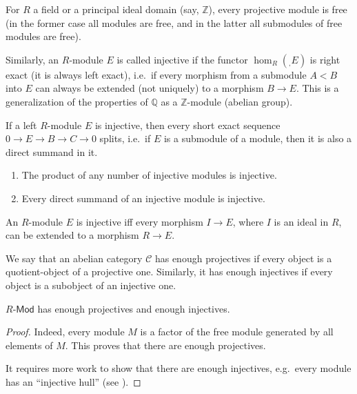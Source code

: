 \documentclass[english,letterpaper]{article}%
\numberwithin{equation}{section}
\numberwithin{figure}{section}
\numberwithin{table}{section}
\theoremstyle{definition}
\theoremstyle{definition}
\theoremstyle{definition}
\theoremstyle{plain}
\theoremstyle{plain}
\theoremstyle{plain}
\theoremstyle{plain}
\theoremstyle{remark}
\theoremstyle{remark}
\newcommand{\bbZ}{\mathbb{Z}}
\newcommand{\bbQ}{\mathbb{Q}}
\newcommand{\calC}{\mathcal{C}}
\begin{document}
For $R$ a field or a principal ideal domain (say, $\bbZ$), every projective module is free (in the former case all modules are free, and in the latter all submodules of free modules are free).


Similarly, an $R$-module $E$ is called injective if the functor $\hom_R(_,E)$ is right exact (it is always left exact), i.e.\ if every morphism from a submodule $A<B$ into $E$ can always be extended (not uniquely) to a morphism $B\to E$. This is a generalization of the properties of $\bbQ$ as a $\bbZ$-module (abelian group).

\begin{prop}
    If a left $R$-module $E$ is injective, then every short exact sequence $0\to E\to B\to C\to 0$ splits, i.e.\ if $E$ is a submodule of a module, then it is also a direct summand in it.
\end{prop}

\begin{prop}
    \begin{enumerate}
        \item The product of any number of injective modules is injective.
        \item Every direct summand of an injective module is injective.
    \end{enumerate}
\end{prop}

\begin{thm}
    An $R$-module $E$ is injective iff every morphism $I\to E$, where $I$ is an ideal in $R$, can be extended to a morphism $R\to E$.
\end{thm}


\begin{defn}
    We say that an abelian category $\calC$ has enough projectives if every object is a quotient-object of a projective one. Similarly, it has enough injectives if every object is a subobject of an injective one.
\end{defn}

\begin{prop}
    $R\text{-}\mathsf{Mod}$ has enough projectives and enough injectives. 
\end{prop}
\begin{proof}
     Indeed, every module $M$ is a factor of the free module generated by all elements of $M$. This proves that there are enough projectives. 
     
     It requires more work to show that there are enough injectives, e.g.\ every module has an ``injective hull'' (see \cite[Thm. 3.38]{Rotman}).
\end{proof}
\end{document}
